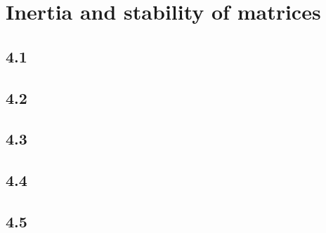 \section{Inertia and stability of matrices}
\subsection*{4.1}
\nosolution

\subsection*{4.2}
\nosolution

\subsection*{4.3}
\nosolution

\subsection*{4.4}
\nosolution

\subsection*{4.5}
\nosolution
